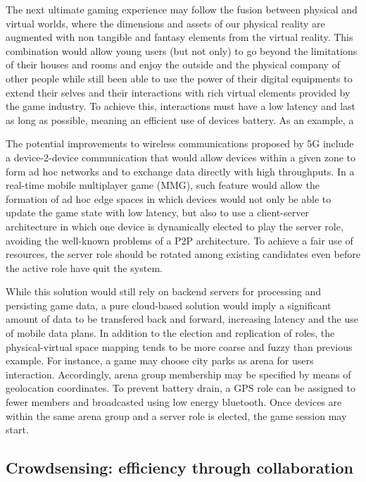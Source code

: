 The next ultimate gaming experience may follow the fusion between physical and virtual worlds, where the dimensions and assets of our physical reality are augmented with non tangible and fantasy elements from the virtual reality. This combination would allow young users (but not only) to go beyond the limitations of their houses and rooms and enjoy the outside and the physical company of other people while still been able to use the power of their digital equipments to extend their selves and their interactions with rich virtual elements provided by the game industry. To achieve this, interactions must have a low latency and last as long as possible, meaning an efficient use of devices battery. As an example, a

The potential improvements to wireless communications proposed by 5G include a device-2-device communication that would allow devices within a given zone to form ad hoc networks and to exchange data directly with high throughputs. In a real-time mobile multiplayer game (MMG), such feature would allow the formation of ad hoc edge spaces in which devices would not only be able to update the game state with low latency, but also to use a client-server architecture in which one device is dynamically elected to play the server role, avoiding the well-known problems of a P2P architecture. To achieve a fair use of resources, the server role should be rotated among existing candidates even before the active role have quit the system. 

While this solution would still rely on backend servers for processing and persisting game data, a pure cloud-based solution would imply a significant amount of data to be transfered back and forward, increasing latency and the use of mobile data plans. In addition to the election and replication of roles, the physical-virtual space mapping tends to be more coarse and fuzzy than previous example. For instance, a game may choose city parks as arena for users interaction. Accordingly, arena group membership may be specified by means of geolocation coordinates. To prevent battery drain, a GPS role can be assigned to fewer members and broadcasted using low energy bluetooth. Once devices are within the same arena group and a server role is elected, the game session may start.


\subsection{Crowdsensing: efficiency through collaboration}


